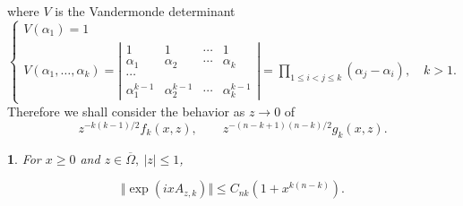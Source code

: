 \documentclass{surv-l}
\theoremstyle{plain}
\newtheorem{lemma}[theorem]{\sc{Lemma}}
\theoremstyle{definition}
\numberwithin{equation}{chapter}
\begin{document}
where $V$ is the Vandermonde determinant
\begin{equation}\label{eq6.2}
\left\{\begin{array}{ll}
V(\alpha_{1})=1 & \\
V(\alpha_{1},\ldots,\alpha_{k})=\left|\begin{array}{cccc}
                                      1 & 1 & \cdots & 1 \\
                                      \alpha_{1} & \alpha_{2} & \cdots & \alpha_{k} \\
                                      \cdots &  &  &  \\
                                      {\alpha_{1}^{k-1}} & {\alpha_{2}^{k-1}} & \cdots & {\alpha_{k}^{k-1}}
                                    \end{array}\right|
=\prod_{1\leq i<j\leq k}(\alpha_{j}-\alpha_{i}),\quad k>1.
\end{array}\right.
\end{equation}
Therefore we shall consider the behavior as $z\rightarrow 0$ of
\begin{equation}\label{eq6.3}
z^{-k(k-1)/2}f_{k}(x, z),\qquad z^{-(n-k+1)(n-k)/2}g_{k}(x, z).
\end{equation}
\setcounter{theorem}{3}
\begin{lemma}\label{chap01:lem6.4}
For $x\geq 0$ and $z\in\overline{\Omega},\ |z|\leq 1$,
\end{lemma}
\setcounter{equation}{4}
\begin{equation}\label{eq6.5}
\Vert\exp(ixA_{z,k})\Vert\leq C_{nk}(1+x^{k(n-k)}).
\end{equation}
\end{document}

